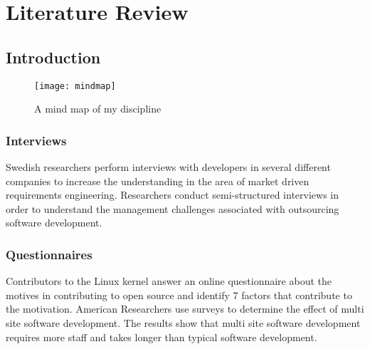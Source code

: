 
\chapter{Literature Review} %

\label{Chapter2} %



\section{Introduction}
\begin{figure}[h]
\texttt{[image: mindmap]}
\caption{A mind map of my discipline}
\centering
\end{figure}
\subsection{Interviews}

Swedish researchers perform interviews with developers in several different companies to increase the understanding in the area of market driven requirements engineering.\cite{Interview1}
Researchers conduct semi-structured interviews in order to understand the management challenges associated with outsourcing software development.\cite{Interview2}


\subsection{Questionnaires}

Contributors to the Linux kernel answer an online questionnaire about the motives in contributing to open source and identify 7 factors that contribute to the motivation.\cite{Questionnaire1}
American Researchers use surveys to determine the effect of multi site software development. The results show that multi site software development requires more staff and takes longer than typical software development.\cite{Questionnaire2}

